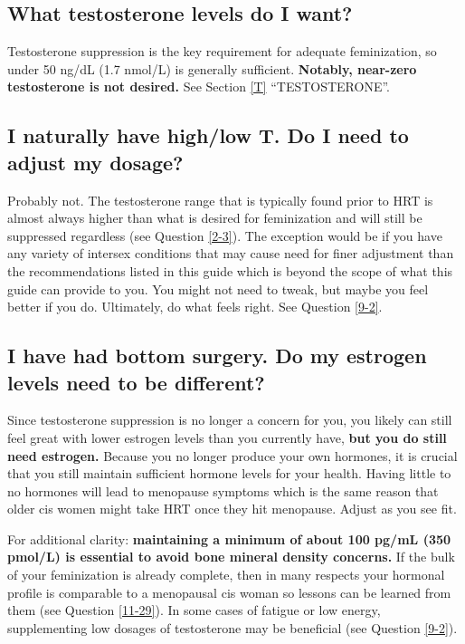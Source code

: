 \documentclass{article}
\begin{document}
\subsection{What testosterone levels do I want?}

Testosterone suppression is the key requirement for adequate feminization, so under 50 ng/dL (1.7 nmol/L) is generally sufficient. \textbf{Notably, near-zero testosterone is not desired.} See Section \ref{T} “TESTOSTERONE”.

\subsection{I naturally have high/low T. Do I need to adjust my dosage?}

Probably not. The testosterone range that is typically found prior to HRT is almost always higher than what is desired for feminization and will still be suppressed regardless (see Question \ref{2-3}). The exception would be if you have any variety of intersex conditions that may cause need for finer adjustment than the recommendations listed in this guide which is beyond the scope of what this guide can provide to you. You might not need to tweak, but maybe you feel better if you do. Ultimately, do what feels right. See Question \ref{9-2}.

\subsection{I have had bottom surgery. Do my estrogen levels need to be different?}

Since testosterone suppression is no longer a concern for you, you likely can still feel great with lower estrogen levels than you currently have, \textbf{but you do still need estrogen.} Because you no longer produce your own hormones, it is crucial that you still maintain sufficient hormone levels for your health. Having little to no hormones will lead to menopause symptoms which is the same reason that older cis women might take HRT once they hit menopause. Adjust as you see fit.

For additional clarity: \textbf{maintaining a minimum of about 100 pg/mL (350 pmol/L) is essential to avoid bone mineral density concerns.} If the bulk of your feminization is already complete, then in many respects your hormonal profile is comparable to a menopausal cis woman so lessons can be learned from them (see Question \ref{11-29}). In some cases of fatigue or low energy, supplementing low dosages of testosterone may be beneficial (see Question \ref{9-2}).
\end{document}
